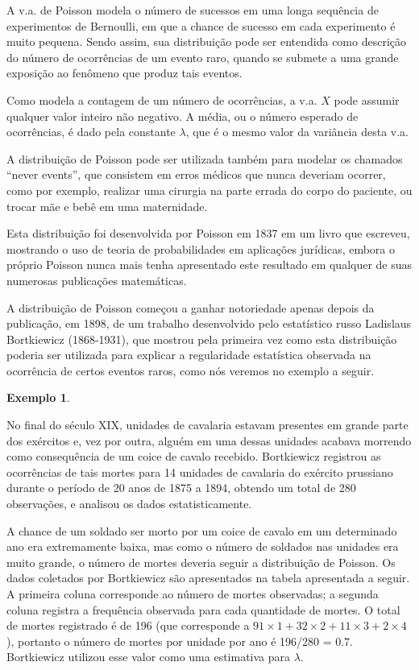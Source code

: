 \documentclass[
]{book}
\theoremstyle{definition}
\theoremstyle{definition}
\newtheorem{example}{Exemplo}[chapter]
\theoremstyle{definition}
\theoremstyle{remark}
\begin{document}
A v.a. de Poisson modela o número de sucessos em uma longa sequência de experimentos de Bernoulli, em que a chance de sucesso em cada experimento é muito pequena. Sendo assim, sua distribuição pode ser entendida como descrição do número de ocorrências de um evento raro, quando se submete a uma grande exposição ao fenômeno que produz tais eventos.

Como modela a contagem de um número de ocorrências, a v.a. \(X\) pode assumir qualquer valor inteiro não negativo. A média, ou o número esperado de ocorrências, é dado pela constante \(\lambda\), que é o mesmo valor da variância desta v.a.

A distribuição de Poisson pode ser utilizada também para modelar os chamados ``never events'', que consistem em erros médicos que nunca deveriam ocorrer, como por exemplo, realizar uma cirurgia na parte errada do corpo do paciente, ou trocar mãe e bebê em uma maternidade.

Esta distribuição foi desenvolvida por Poisson em 1837 em um livro que escreveu, mostrando o uso de teoria de probabilidades em aplicações jurídicas, embora o próprio Poisson nunca mais tenha apresentado este resultado em qualquer de suas numerosas publicações matemáticas.

A distribuição de Poisson começou a ganhar notoriedade apenas depois da publicação, em 1898, de um trabalho desenvolvido pelo estatístico russo Ladislaus Bortkiewicz (1868-1931), que mostrou pela primeira vez como esta distribuição poderia ser utilizada para explicar a regularidade estatística observada na ocorrência de certos eventos raros, como nós veremos no exemplo a seguir.

\begin{example}
\protect\hypertarget{exm:unnamed-chunk-1}{}{\label{exm:unnamed-chunk-1} }
\end{example}

No final do século XIX, unidades de cavalaria estavam presentes em grande parte dos exércitos e, vez por outra, alguém em uma dessas unidades acabava morrendo como consequência de um coice de cavalo recebido. Bortkiewicz registrou as ocorrências de tais mortes para 14 unidades de cavalaria do exército prussiano durante o período de 20 anos de 1875 a 1894, obtendo um total de 280 observações, e analisou os dados estatisticamente.

A chance de um soldado ser morto por um coice de cavalo em um determinado ano era extremamente baixa, mas como o número de soldados nas unidades era muito grande, o número de mortes deveria seguir a distribuição de Poisson. Os dados coletados por Bortkiewicz são apresentados na tabela apresentada a seguir. A primeira coluna corresponde ao número de mortes observadas; a segunda coluna registra a frequência observada para cada quantidade de mortes. O total de mortes registrado é de 196 (que corresponde a \(91 \times 1 + 32 \times 2 + 11 \times 3 + 2 \times 4\) ), portanto o número de mortes por unidade por ano é 196/280 = 0.7. Bortkiewicz utilizou esse valor como uma estimativa para \(\lambda\).
\end{document}
